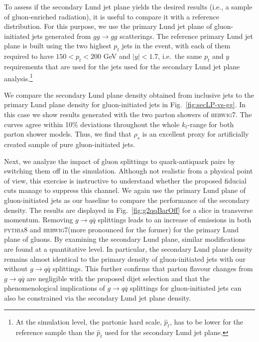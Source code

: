 \documentclass[a4paper,11pt]{article}
\newcommand{\py}{{\textsc{pythia}}8\xspace}
\newcommand{\hw}{{\textsc{herwig}}7\xspace}
\begin{document}
To assess if the secondary Lund jet plane yields the desired results (i.e., a sample of gluon-enriched radiation), it is useful to compare it with a reference distribution. For this purpose, we use the primary Lund jet plane of gluon-initiated jets generated from $gg\to gg$ scatterings. The reference primary Lund jet plane is built using the two highest $p_t$ jets in the event, with each of them required to have $150 < p_{t} < 200$ GeV and $|y| < 1.7$, i.e.\ the same $p_t$ and $y$ requirements that are used for the jets used for the secondary Lund jet plane analysis.\footnote{At the simulation level, the partonic hard scale, $\hat{p}_t$, has to be lower for the reference sample than the $\hat{p}_t$ used for the secondary Lund jet plane.}

We compare the secondary Lund plane density obtained from inclusive jets to the primary Lund plane density for gluon-initiated jets in Fig.~\ref{fig:secLP-vs-gg}. In this case we show results generated with the two parton showers of \hw. The curves agree within 10\% deviations throughout the whole $k_t$-range for both parton shower models. Thus, we find that $\rho_s$ is an excellent proxy for artificially created sample of pure gluon-initiated jets.

Next, we analyze the impact of gluon splittings to quark-antiquark pairs by switching them off in the simulation. Although not realistic from a physical point of view, this exercise is instructive to understand whether the proposed fiducial cuts manage to suppress this channel. We again use the primary Lund plane of gluon-initiated jets as our baseline to compare the performance of the secondary density. The results are displayed in Fig.~\ref{fig:g2qqBarOff} for a slice in transverse momentum. Removing $g\to q\bar q$ splittings leads to an increase of emissions in both \py and \hw (more pronounced for the former) for the primary Lund plane of gluons. By examining the secondary Lund plane, similar modifications are found at a quantitative level. In particular, the secondary Lund plane density remains almost identical to the primary density of gluon-initiated jets with our without $g\to q\bar q$ splittings. This further confirms that parton flavour changes from $g\to q\bar{q}$ are negligible with the proposed dijet selection and that the phenomenological implications of $g\to q\bar{q}$ splittings for gluon-initiated jets can also be constrained via the secondary Lund jet plane density.
\end{document}

